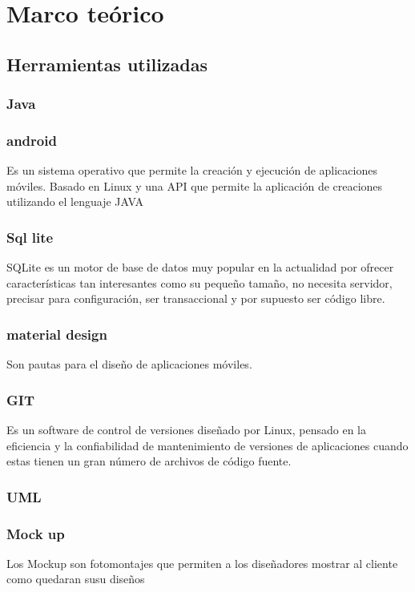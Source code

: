 \chapter{Marco te\'orico}



\section{Herramientas utilizadas}

\subsection{Java}



\subsection{android}
Es un sistema operativo que permite la creaci\'on y ejecuci\'on de aplicaciones m\'oviles. Basado en Linux y una API que permite la aplicaci\'on de creaciones utilizando el lenguaje JAVA 


\subsection{Sql lite}
SQLite es un motor de base de datos muy popular en la actualidad por ofrecer caracter\'isticas tan interesantes como su pequeño tamaño, no necesita servidor, precisar para configuraci\'on, ser transaccional y por supuesto ser c\'odigo libre.
	

\subsection{material design}
Son pautas para el diseño de aplicaciones m\'oviles.


\subsection{GIT}
Es un software de control de versiones diseñado por Linux, pensado en la eficiencia y la confiabilidad de mantenimiento de versiones de aplicaciones cuando estas tienen un gran n\'umero de archivos de c\'odigo fuente.


\subsection{UML}

\subsection{Mock up}
Los Mockup son fotomontajes que permiten a los diseñadores mostrar al cliente como quedaran susu diseños
